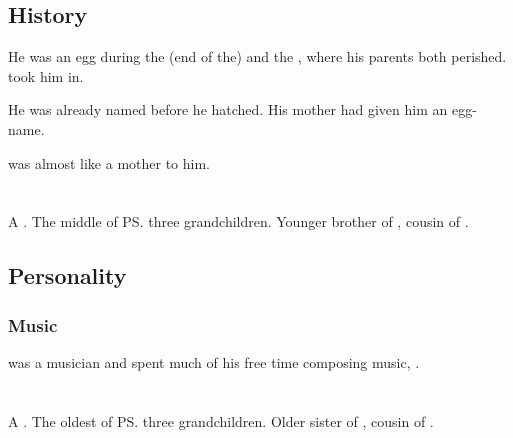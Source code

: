 \subsection{History}
He was an egg during the (end of the) \Secondbanewar{} and the \SecondShrouding{}, where his parents both perished. 
\Ishnaruchaefir{} took him in. 

He was already named before he hatched. 
His mother had given him an egg-name. 

\Criseis{} was almost like a mother to him. 

















\section{\Tentocoth}
\index{\Tentocoth}
A \dragon. 
The middle of \ps{\QuessanthIshnaruchaefir} three grandchildren. 
Younger brother of \Thiencaste, cousin of \Rathyon. 









\subsection{Personality}
\subsubsection{Music}
\Tentocoth{} was a musician and spent much of his free time composing music, . 
















\section{\Thiencaste}
\index{\Thiencaste}
A \dragon. 
The oldest of \ps{\QuessanthIshnaruchaefir} three grandchildren. 
Older sister of \Tentocoth, cousin of \Rathyon. 















